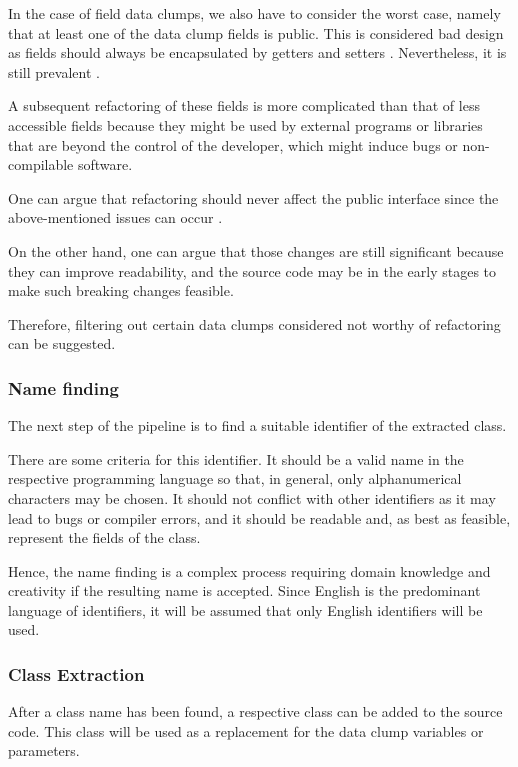In the case of field data clumps, we also have to consider the worst case, namely that at least one of the data clump fields is public. This is considered bad design as fields should always be encapsulated by getters and setters \cite{5680918}. Nevertheless, it is still prevalent \cite{5076631}.

A subsequent refactoring of these fields is more complicated than that of less accessible fields because they might be used by external programs or libraries that are beyond the control of the developer, which might induce bugs or non-compilable software. 

One can argue that refactoring should never affect the public interface since the above-mentioned issues can occur \cite{10.1145/1352678.1352681}.

On the other hand, one can argue that those changes are still significant because they can improve readability, and the source code may be in the early stages to make such breaking changes feasible. 

Therefore, filtering out certain data clumps considered not worthy of refactoring can be suggested.

\subsubsection{Name finding}\label{subsec:chap3_data_clump_name_finding}
The next step of the pipeline is to find a suitable identifier of the extracted class.

There are some criteria for this identifier. It should be a valid name in the respective programming language so that, in general, only alphanumerical characters may be chosen. It should not conflict with other identifiers as it may lead to bugs or compiler errors, and it should be readable and, as best as feasible, represent the fields of the class.

Hence, the name finding is a complex process requiring domain knowledge and creativity if the resulting name is accepted. 
Since English is the predominant language of identifiers, it will be assumed that only English identifiers will be used. 


\subsubsection{Class Extraction}\label{subsec:chap3_data_class_extraction}
After a class name has been found, a respective class can be added to the source code. This class will be used as a replacement for the data clump variables or parameters. 

